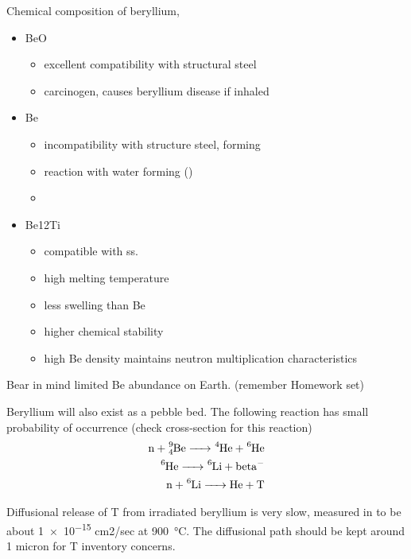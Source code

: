 \documentclass[11pt]{report} %
\begin{document}
Chemical composition of beryllium,
\begin{itemize}
\item{BeO}
\begin{itemize}
\item{excellent compatibility with structural steel}
\item{carcinogen, causes beryllium disease if inhaled}
\end{itemize}
\item{Be}
\begin{itemize}
\item{incompatibility with structure steel, forming }
\item{ reaction with water forming  ()}
\item{}
\end{itemize}
\item{Be12Ti}
\begin{itemize}
\item{compatible with ss.}
\item{high melting temperature}
\item{less swelling than Be}
\item{higher chemical stability}
\item{high Be density maintains neutron multiplication characteristics}
\end{itemize}
\end{itemize}
Bear in mind limited Be abundance on Earth. (remember Homework set)

Beryllium will also exist as a pebble bed. The following reaction has small probability of occurrence (check cross-section for this reaction)
\begin{align*}
\ce{n + ^9_4Be -> ^4He + ^6He} \\
\ce{^6He -> ^6Li + beta^-} \\
\ce{n + ^6Li -> He + T}
\end{align*}

Diffusional release of T from irradiated beryllium is very slow, measured in  to be about \num{1e-15} cm2/sec at \SI{900}{\celsius}. The diffusional path should be kept around 1 micron for T inventory concerns.
\end{document}
